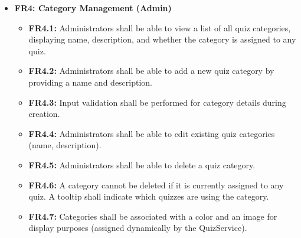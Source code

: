 \begin{itemize}
    \item \textbf{FR4: Category Management (Admin)}
    \begin{itemize}
        \item \textbf{FR4.1:} Administrators shall be able to view a list of all quiz categories, displaying name, description, and whether the category is assigned to any quiz.
        \item \textbf{FR4.2:} Administrators shall be able to add a new quiz category by providing a name and description.
        \item \textbf{FR4.3:} Input validation shall be performed for category details during creation.
        \item \textbf{FR4.4:} Administrators shall be able to edit existing quiz categories (name, description).
        \item \textbf{FR4.5:} Administrators shall be able to delete a quiz category.
        \item \textbf{FR4.6:} A category cannot be deleted if it is currently assigned to any quiz. A tooltip shall indicate which quizzes are using the category.
        \item \textbf{FR4.7:} Categories shall be associated with a color and an image for display purposes (assigned dynamically by the QuizService).
    \end{itemize}


\end{itemize}

